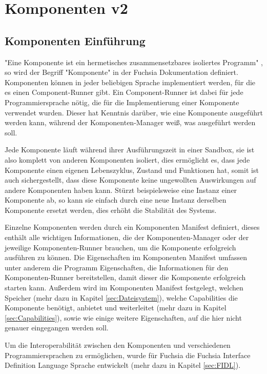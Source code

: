 \documentclass[a4paper]{scrartcl}
\begin{document}
\section{Komponenten v2}
\subsection{Komponenten Einführung}
\label{sec:Components}
"Eine Komponente ist ein hermetisches zusammensetzbares isoliertes Programm" \cite{Fuchsia.Components.Introduction}, so wird der Begriff "Komponente" in der Fuchsia Dokumentation definiert. Komponenten können in jeder beliebigen Sprache implementiert werden, für die es einen Component-Runner gibt. Ein Component-Runner ist dabei für jede Programmiersprache nötig, die für die Implementierung einer Komponente verwendet wurden. Dieser hat Kenntnis darüber, wie eine Komponente ausgeführt werden kann, während der Komponenten-Manager weiß, was ausgeführt werden soll.

Jede Komponente läuft während ihrer Ausführungszeit in einer Sandbox, sie ist also komplett von anderen Komponenten isoliert, dies ermöglicht es, dass jede Komponente einen eigenen Lebenszyklus, Zustand und Funktionen hat, somit ist auch sichergestellt, dass diese Komponente keine ungewollten Auswirkungen auf andere Komponenten haben kann. Stürzt beispielsweise eine Instanz einer Komponente ab, so kann sie einfach durch eine neue Instanz derselben Komponente ersetzt werden, dies erhöht die Stabilität des Systems.

Einzelne Komponenten werden durch ein Komponenten Manifest definiert, dieses enthält alle wichtigen Informationen, die der Komponenten-Manager oder der jeweilige Komponenten-Runner brauchen, um die Komponente erfolgreich ausführen zu können. \cite{Fuchsia.Components} 
Die Eigenschaften im Komponenten Manifest umfassen unter anderem die Programm Eigenschaften, die Informationen für den Komponenten-Runner bereitstellen, damit dieser die Komponente erfolgreich starten kann. Außerdem wird im Komponenten Manifest festgelegt, welchen Speicher (mehr dazu in Kapitel \ref{sec:Dateisystem}),  welche Capabilities die Komponente benötigt, anbietet und weiterleitet (mehr dazu in Kapitel \ref{sec:Capabilities}), sowie wie einige weitere Eigenschaften, auf die hier nicht genauer eingegangen werden soll.

Um die Interoperabilität zwischen den Komponenten und verschiedenen Programmiersprachen zu ermöglichen, wurde für Fuchsia die Fuchsia Interface Definition Language Sprache entwickelt (mehr dazu in Kapitel \ref{sec:FIDL}).
\end{document}
